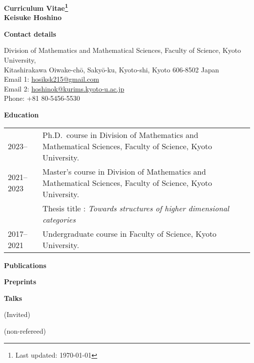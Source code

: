 \documentclass[a4paper,dvipsnames,11pt,backend=luatex]{article} %
\newcommand*{\cvsection}[1]{%
  \vspace{1.2\baselineskip}%
  {\raggedright          %
   \bfseries\large       %
   #1\par}               %
  \vspace{0.4\baselineskip}%
}
\begin{document}
\begin{center}\large\bfseries Curriculum Vitae\footnote{Last updated: \today}
\\
\rm Keisuke Hoshino
\end{center}
\noindent %
\cvsection{Contact details}
\vspace{-1em}%
\noindent %
Division of Mathematics and Mathematical Sciences, Faculty of Science, Kyoto University,
\\
Kitashirakawa Oiwake-chō, Sakyō-ku, Kyoto-shi,
Kyoto 606-8502  
Japan
\\
Email 1: \href{mailto:hosiksk215@gmail.com}{hosiksk215@gmail.com}
\\
Email 2: \href{mailto:hoshinok@kurims.kyoto-u.ac.jp}{hoshinok@kurims.kyoto-u.ac.jp}
\\
Phone: +81 80-5456-5530


\cvsection{Education}
\begin{tabularx}{\textwidth}{@{}lp{140mm}}
  2023--
  &
  Ph.D.\ course in Division of Mathematics and Mathematical Sciences, Faculty of Science, Kyoto University.
  \\
  2021--2023
  &
  Master's course in Division of Mathematics and Mathematical Sciences, Faculty of Science, Kyoto University.
  \\&
  Thesis title : \textit{Towards structures of higher dimensional categories}
  \\
  2017--2021
  &
  Undergraduate course in Faculty of Science, Kyoto University.
\end{tabularx}

\cvsection{Publications}
\begin{refsection}                      %
  \nocite{*} %
  \printbibliography[heading=none,keyword=published,resetnumbers=true]
\end{refsection}

\cvsection{Preprints}
\begin{refsection}
\nocite{*} %
  \printbibliography[heading=none,keyword=preprint,resetnumbers=true]
\end{refsection}

\cvsection{Talks}
(Invited)
\begin{refsection}
\nocite{*} %
  \printbibliography[heading=none,keyword=iv-talk,resetnumbers=true]
\end{refsection}

(non-refereed)
\begin{refsection}
\nocite{*} %
  \printbibliography[heading=none,keyword=nr-talk,resetnumbers=true]
\end{refsection}
\end{document}
